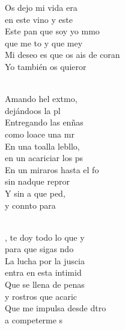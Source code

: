 \documentclass[12pt]{article}
\begin{document}
\begin{multicols*}{2}
\begin{cancion}
            Os dejo mi vida era \\
            en este vino y este \\
            Este pan que soy yo mmo \\
            que me to y que mey\\
            Mi deseo es que os ais de coran \\
            Yo también os quieror\\\jump\\
            \begin{chorus}%
            Amando hel extmo, \\
            dejándoos la pl\\
            Entregando las enñas \\
            como loace una mr\\
            En una toalla lebllo, \\
            en un acariciar los ps\\
            En un miraros hasta el fo \\
            sin nadque repror\\
            Y sin a que ped, \\
            y connto para \\
            \end{chorus}%
            \jump\\
            , te doy todo lo que y \\
            para que sigas ndo\\
            La lucha por la juscia \\
            entra en esta intimid\\
            Que se llena de penas \\
            y rostros que acaric\\
            Que me impulsa desde dtro \\
            a competerme s\\

\end{cancion}
\end{multicols*}
\end{document}
